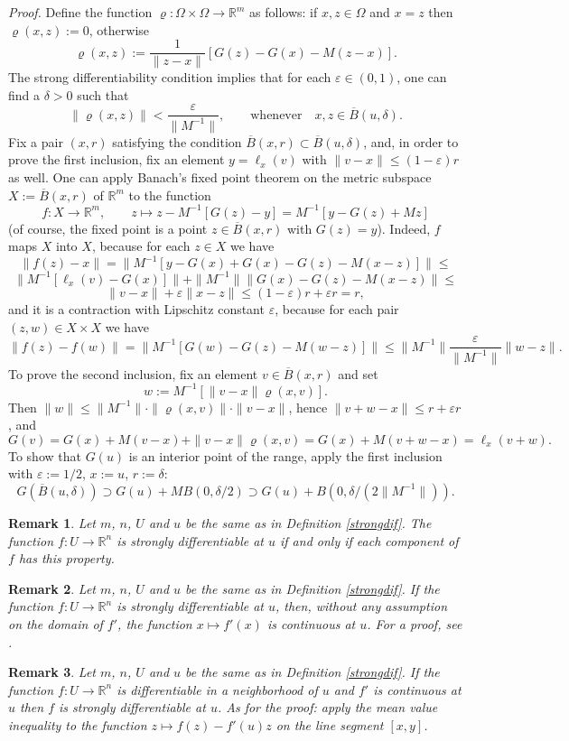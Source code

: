 \documentclass{article}
\newcommand{\proof}[1]{\textit{Proof. }#1}
\newtheorem{remark}{Remark}
\newcommand{\R}{\ensuremath{\mathbb R}}
\newcommand{\ee}{\varepsilon}
\newcommand{\dd}{\delta}
\newcommand{\ol}{\overline}
\begin{document}
\proof{ Define the function $ \varrho:\Omega\times\Omega\to\R^m $
as follows: if $x,z\in\Omega$ and $x=z$ then $\varrho(x,z):=0$,
otherwise
\[\varrho(x,z):=\frac{1}{\|z-x\|}[G(z)-G(x)-M(z-x)].\]
The strong differentiability condition implies that for each
$\ee\in(0,1)$, one can find a $\delta>0$ such that
\[\|\varrho(x,z)\|<\frac{\ee}{\|M^{-1}\|},\qquad\mbox{whenever}\quad
x,z\in\ol{B}(u,\delta).\] Fix a pair $(x,r)$ satisfying the
condition $\ol{B}(x,r)\subset\ol{B}(u,\delta)$, and, in order to
prove the first inclusion, fix an element $y=\ell_x(v)$ with
$\|v-x\|\le(1-\ee)r$ as well. One can apply Banach's fixed point
theorem on the metric subspace $X:=\ol{B}(x,r)$ of $\R^m$ to the
function
\[f:X\to\R^m,\quad\quad z\mapsto z-M^{-1}[G(z)-y]=M^{-1}[y-G(z)+Mz]\]
(of course, the fixed point is a point $z\in\ol{B}(x,r)$ with
$G(z)=y$). Indeed, $f$ maps $X$ into $X$, because for each $z\in
X$ we have
\[\|f(z)-x\|=\|M^{-1}[y-G(x)+G(x)-G(z)-M(x-z)]\|\le\]
\[\|M^{-1}[\ell_x(v)-G(x)]\|+\|M^{-1}\|\|G(x)-G(z)-M(x-z)\|\le\]
\[\|v-x\|+\ee\|x-z\|\le(1-\ee)r+\ee r=r,\]
and it is a contraction with Lipschitz constant $\ee$, because for
each pair $(z,w)\in X\times X$ we have
\[\|f(z)-f(w)\|=\|M^{-1}[G(w)-G(z)-M(w-z)]\|\le
\|M^{-1}\|\frac{\ee}{\|M^{-1}\|}\|w-z\|.\] To prove the second
inclusion, fix an element $v\in\ol{B}(x,r)$ and set
\[w:=M^{-1}[\|v-x\|\varrho(x,v)].\] Then
$\|w\|\le\|M^{-1}\|\cdot\|\varrho(x,v)\|\cdot\|v-x\|$, hence
$\|v+w-x\|\le r+\varepsilon r$, and
\[G(v)=G(x)+M(v-x)+\|v-x\|\varrho(x,v)=G(x)+M(v+w-x)=\ell_x(v+w). \]
To show that $G(u)$ is an interior point of the range, apply the
first inclusion with $\ee:=1/2$, $x:=u$, $r:=\dd$:
\[G(\ol{B}(u,\dd))\supset G(u)+MB(0,\dd/2)\supset
G(u)+B(0,\dd/(2\|M^{-1}\|)).\]%
}%

\begin{remark}\label{edked}
Let $ m $, $ n $, $ U $ and $ u $ be the same as in Definition
\ref{strongdif}. The function $f:U\to\R^n$ is strongly
differentiable at $ u $ if and only if each component of $ f $ has
this property.\end{remark}
\begin{remark} \label{contofstd}
Let $ m $, $ n $, $ U $ and $ u $ be the same as in Definition
\ref{strongdif}. If the function $ f:U\to\R^n $ is strongly
differentiable at $u$, then, without any assumption on the domain
of $f'$, the function $ x\mapsto f'(x)$ is continuous at $ u $.
For a proof, see \cite{Nijenhuis:74}.\end{remark}
\begin{remark}
Let $ m $, $ n $, $ U $ and $ u $ be the same as in Definition
\ref{strongdif}. If the function $ f:U\to\R^n $ is differentiable
in a neighborhood of $ u $ and $ f' $ is continuous at $ u $ then
$ f $ is strongly differentiable at $ u $. As for the proof: apply
the mean value inequality to the function $ z\mapsto f(z)-f'(u)z $
on the line segment $[x,y]$. \end{remark}
\end{document}
